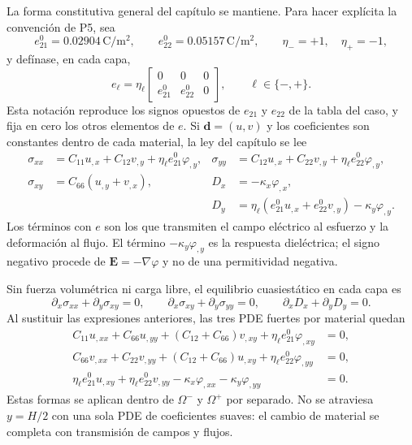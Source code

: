 La forma constitutiva general del capítulo se mantiene. Para hacer explícita
la convención de P5, sea
\[
  e_{21}^{0}=0.02904\,\mathrm{C}/\mathrm{m}^{2},\qquad
  e_{22}^{0}=0.05157\,\mathrm{C}/\mathrm{m}^{2},\qquad
  \eta_-=+1,\quad \eta_+=-1,
\]
y defínase, en cada capa,
\begin{equation}
  e_\ell=\eta_\ell
  \begin{bmatrix}
    0&0&0\\
    e_{21}^{0}&e_{22}^{0}&0
  \end{bmatrix},
  \qquad \ell\in\{-,+\}.
  \label{eq:p5-expansion-e-sign}
\end{equation}
Esta notación reproduce los signos opuestos de $e_{21}$ y $e_{22}$ de la
tabla del caso, y fija en cero los otros elementos de $e$. Si
$\mathbf d=(u,v)$ y los coeficientes son constantes dentro de cada material,
la ley del capítulo se lee
\begin{align}
  \sigma_{xx}&=C_{11}u_{,x}+C_{12}v_{,y}
       +\eta_\ell e_{21}^{0}\varphi_{,y},
  &\sigma_{yy}&=C_{12}u_{,x}+C_{22}v_{,y}
       +\eta_\ell e_{22}^{0}\varphi_{,y},
  \label{eq:p5-expansion-stress-normal}\\
  \sigma_{xy}&=C_{66}(u_{,y}+v_{,x}),
  &D_x&=-\kappa_x\varphi_{,x},
  \label{eq:p5-expansion-stress-shear}\\
  &&D_y&=\eta_\ell(e_{21}^{0}u_{,x}+e_{22}^{0}v_{,y})
       -\kappa_y\varphi_{,y}.
  \label{eq:p5-expansion-flux}
\end{align}
Los términos con $e$ son los que transmiten el campo eléctrico al esfuerzo y
la deformación al flujo. El término $-\kappa_y\varphi_{,y}$ es la respuesta
dieléctrica; el signo negativo procede de $\mathbf E=-\nabla\varphi$ y no de
una permitividad negativa.

Sin fuerza volumétrica ni carga libre, el equilibrio cuasiestático en cada
capa es
\begin{equation}
  \partial_x\sigma_{xx}+\partial_y\sigma_{xy}=0,\qquad
  \partial_x\sigma_{xy}+\partial_y\sigma_{yy}=0,\qquad
  \partial_xD_x+\partial_yD_y=0.
  \label{eq:p5-expansion-balances}
\end{equation}
Al sustituir las expresiones anteriores, las tres PDE fuertes por material
quedan
\begin{align}
  C_{11}u_{,xx}+C_{66}u_{,yy}+(C_{12}+C_{66})v_{,xy}
      +\eta_\ell e_{21}^{0}\varphi_{,xy}&=0,\\
  C_{66}v_{,xx}+C_{22}v_{,yy}+(C_{12}+C_{66})u_{,xy}
      +\eta_\ell e_{22}^{0}\varphi_{,yy}&=0,\\
  \eta_\ell e_{21}^{0}u_{,xy}+\eta_\ell e_{22}^{0}v_{,yy}
      -\kappa_x\varphi_{,xx}-\kappa_y\varphi_{,yy}&=0.
  \label{eq:p5-expansion-pdes}
\end{align}
Estas formas se aplican dentro de $\Omega^-$ y $\Omega^+$ por separado. No
se atraviesa $y=H/2$ con una sola PDE de coeficientes suaves: el cambio de
material se completa con transmisión de campos y flujos.

